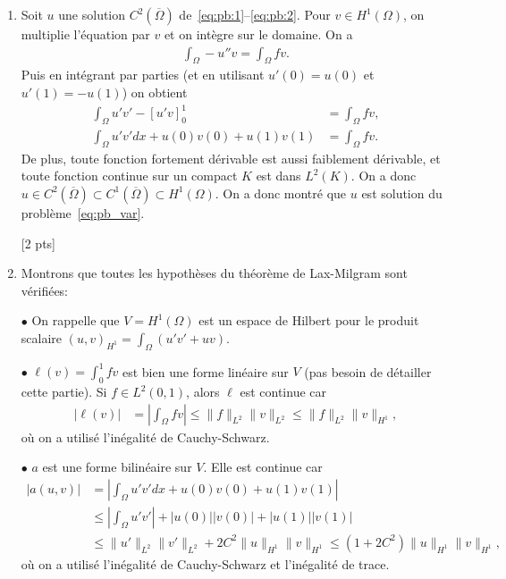 \documentclass[12pt]{article}
\begin{document}

\begin{cor} $\quad$
  \\
  \begin{enumerate}
  \item Soit $u$ une solution $C^2(\overline{\Omega})$ de~\eqref{eq:pb:1}--\eqref{eq:pb:2}.
    Pour $v \in H^1(\Omega)$, on multiplie l'\'equation par $v$ et on int\`egre sur le domaine.
    On a
    \begin{align*}
      \int_{\Omega} -u'' v = \int_{\Omega} f v .
    \end{align*}
    Puis en int\'egrant par parties (et en utilisant $u'(0) = u(0)$ et $u'(1) = - u(1)$) on obtient
    \begin{align*}
      \int_{\Omega} u' v' - [u' v]^1_0
      &= \int_{\Omega} f v ,
      \\
      \int_{\Omega} u' v' dx + u(0)v(0) + u(1) v(1)
      &= \int_{\Omega} f v .
    \end{align*}
    De plus, toute fonction fortement d\'erivable est aussi faiblement d\'erivable,
    et toute fonction continue sur un compact $K$ est dans $L^2(K)$.
    On a donc $u \in C^2(\overline{\Omega}) \subset C^1(\overline{\Omega}) \subset H^1(\Omega)$.
    On a donc montr\'e que $u$ est solution du probl\`eme~\eqref{eq:pb_var}.
    
    [2 pts]
  \item
    Montrons que toutes les hypoth\`eses du th\'eor\`eme de Lax-Milgram sont v\'erifi\'ees:

    $\bullet$ On rappelle que $V = H^1(\Omega)$ est un espace de Hilbert
    pour le produit scalaire $(u,v)_{H^1} = \int_{\Omega} (u'v' + u v)$.

    $\bullet$ $\ell(v) = \int_0^1 fv$ est bien une forme lin\'eaire sur $V$
    (pas besoin de d\'etailler cette partie).
    Si $f \in L^2(0,1)$, alors $\ell$ est continue car
    \begin{align*}
      | \ell(v) |
      &= \left| \int_{\Omega} f v \right| \leq \| f \|_{L^2} \| v \|_{L^2}
        \leq \| f \|_{L^2} \| v \|_{H^1} ,
    \end{align*}
    o\`u on a utilis\'e l'in\'egalit\'e de Cauchy-Schwarz.


    $\bullet$ $a$ est une forme bilin\'eaire sur $V$.
    Elle est continue car
    \begin{align*}
      | a(u,v) |
      &= \left| \int_{\Omega} u'v' dx + u(0) v(0) + u(1) v(1) \right|
      \\
      &\leq \left| \int_{\Omega} u'v' \right|
        + | u(0) | |v(0)| + |u(1)| | v(1)|
      \\
      &\leq \| u' \|_{L^2} \| v' \|_{L^2}
        + 2 C^2 \| u \|_{H^1} \| v \|_{H^1}
      \leq (1+2C^2) \| u \|_{H^1} \| v \|_{H^1} ,
    \end{align*}
    o\`u on a utilis\'e l'in\'egalit\'e de Cauchy-Schwarz et l'in\'egalit\'e de trace.


\end{enumerate}
\end{cor}
\end{document}
